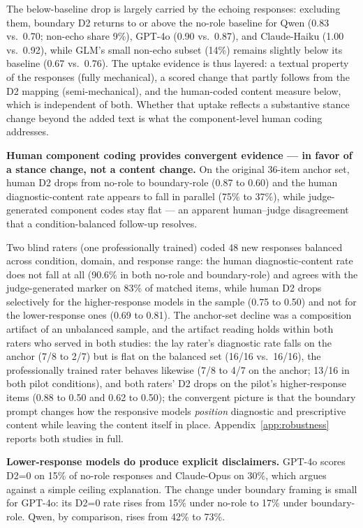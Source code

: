 \documentclass[11pt]{article}
\begin{document}
The below-baseline drop is largely carried by the echoing responses: excluding them, boundary D2 returns to or above the no-role baseline for Qwen (0.83 vs.\ 0.70; non-echo share 9\%), GPT-4o (0.90 vs.\ 0.87), and Claude-Haiku (1.00 vs.\ 0.92), while GLM's small non-echo subset (14\%) remains slightly below its baseline (0.67 vs.\ 0.76). The uptake evidence is thus layered: a textual property of the responses (fully mechanical), a scored change that partly follows from the D2 mapping (semi-mechanical), and the human-coded content measure below, which is independent of both. Whether that uptake reflects a substantive stance change beyond the added text is what the component-level human coding addresses.

\textbf{Human component coding provides convergent evidence --- in favor of a stance change, not a content change.} On the original 36-item anchor set, human D2 drops from no-role to boundary-role (0.87 to 0.60) and the human diagnostic-content rate appears to fall in parallel (75\% to 37\%), while judge-generated component codes stay flat --- an apparent human--judge disagreement that a condition-balanced follow-up resolves.

Two blind raters (one professionally trained) coded 48 new responses balanced across condition, domain, and response range: the human diagnostic-content rate does not fall at all (90.6\% in both no-role and boundary-role) and agrees with the judge-generated marker on 83\% of matched items, while human D2 drops selectively for the higher-response models in the sample (0.75 to 0.50) and not for the lower-response ones (0.69 to 0.81). The anchor-set decline was a composition artifact of an unbalanced sample, and the artifact reading holds within both raters who served in both studies: the lay rater's diagnostic rate falls on the anchor (7/8 to 2/7) but is flat on the balanced set (16/16 vs.\ 16/16), the professionally trained rater behaves likewise (7/8 to 4/7 on the anchor; 13/16 in both pilot conditions), and both raters' D2 drops on the pilot's higher-response items (0.88 to 0.50 and 0.62 to 0.50); the convergent picture is that the boundary prompt changes how the responsive models \emph{position} diagnostic and prescriptive content while leaving the content itself in place. Appendix~\ref{app:robustness} reports both studies in full.

\textbf{Lower-response models do produce explicit disclaimers.} GPT-4o scores D2=0 on 15\% of no-role responses and Claude-Opus on 30\%, which argues against a simple ceiling explanation. The change under boundary framing is small for GPT-4o: its D2=0 rate rises from 15\% under no-role to 17\% under boundary-role. Qwen, by comparison, rises from 42\% to 73\%.
\end{document}
